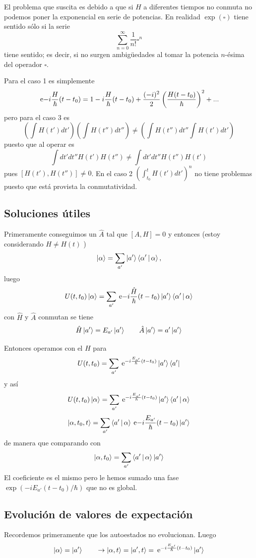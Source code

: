 \documentclass[10pt,oneside]{CBFT_book}
\begin{document}
El problema que suscita es debido a que si $H$ a diferentes tiempos no conmuta no podemos poner la exponencial en serie 
de potencias. En realidad $\exp({\square})$ tiene sentido sólo si la serie 
\[
	\sum_{n=0}^{\infty}  \frac{1}{n!}\square^n
\]
tiene sentido; es decir, si no surgen ambigüedades al tomar la potencia $n$-ésima del operador $\square$.

Para el caso 1 es simplemente 
 \[
	\:\mathrm{e}{-i\frac{H}{\hbar}(t-t_0)} = 1 - i\frac{H}{\hbar}(t - t_0) + 
	\frac{(-i)^2}{2}\left( \frac{H(t-t_0)}{\hbar} \right)^2 + ...
 \]
pero para el caso 3 es 
 \[
	\left( \int H(t') dt' \right)\left( \int H(t'') dt'' \right) \neq 
	\left( \int H(t'') dt'' \int H(t') dt' \right)
 \]
puesto que al operar es 
\[
	\int dt' dt'' H(t')H(t'') \neq \int dt' dt'' H(t'') H(t') 
\]
pues $[H(t'),H(t'')]\neq 0$.
En el caso 2 $(\int_{t_0}^t H(t')dt' )^n$ no tiene problemas puesto que está provista la 
conmutatividad.

\subsection{Soluciones útiles}

Primeramente conseguimos un $\hat{A}$ tal que $[ A, H ]=0$ y entonces (estoy considerando $ H \neq H(t)$ )
\[
	\Ket{\alpha} = \sum_{a'} \Ket{a'}\Braket{\alpha'|\alpha},
\]
luego 
\[
	U(t,t_0)\Ket{\alpha} = \sum_{a'} \:\mathrm{e}{-i\frac{\hat{H}}{\hbar}(t-t_0)}\Ket{a'}\Braket{\alpha'|\alpha}
\]
con $\hat{H}$ y $\hat{A}$ conmutan se tiene
\[
	\hat{H}\Ket{a'}=E_{a'}\Ket{a'} \qquad \hat{A}\Ket{a'}= a'\Ket{a'}
\]

Entonces operamos con el $H$ para 
\[
	U(t,t_0) = \sum_{a'} \:\mathrm{e}^{-i\frac{E_{a'}}{\hbar}(t-t_0)}\Ket{a'}\Bra{a'}
\]
y así 
\[
	U(t,t_0)\Ket{\alpha} = \sum_{a'} \:\mathrm{e}^{-i\frac{E_{a'}}{\hbar}(t-t_0)}\Ket{a'}\Braket{a'|\alpha}
\]
\[
	\Ket{\alpha,t_0,t} = \sum_{a'} \Braket{a'|\alpha} \:\mathrm{e}{-i\frac{E_{a'}}{\hbar}(t-t_0)} \Ket{a'}
\]
de manera que comparando con 
\[
	\Ket{\alpha,t_0} = \sum_{a'} \Braket{a'|\alpha} \Ket{a'}
\]
El coeficiente es el mismo pero le hemos sumado una fase $\exp(-iE_{a'}(t-t_0)/\hbar)$ que no es global.

\subsection{Evolución de valores de expectación}

Recordemos primeramente que los autoestados no evolucionan. Luego 
\[
	\Ket{\alpha} = \Ket{a'} \qquad \to \Ket{\alpha,t} = \Ket{a',t} =  
		\:\mathrm{e}^{-i\frac{E_{a'}}{\hbar}(t-t_0)} \Ket{a'}
\]
\end{document}
